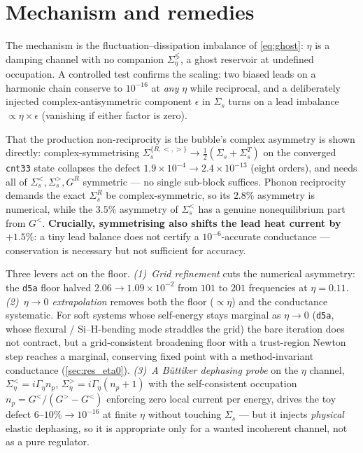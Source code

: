 \section{Mechanism and remedies}
\label{sec:cons_remedies}

The mechanism is the fluctuation--dissipation imbalance of \cref{eq:ghost}:
$\eta$ is a damping channel with no companion $\Sigma_\eta^{\lessgtr}$, a ghost
reservoir at undefined occupation. A controlled test confirms the scaling: two
biased leads on a harmonic chain conserve to $10^{-16}$ at \emph{any} $\eta$
while reciprocal, and a deliberately injected complex-antisymmetric component
$\epsilon$ in $\Sigma_s$ turns on a lead imbalance $\propto\eta\times\epsilon$
(vanishing if either factor is zero).

That the production non-reciprocity is the bubble's complex asymmetry is shown
directly: complex-symmetrising
$\Sigma_s^{\{R,<,>\}}\to\tfrac12(\Sigma_s+\Sigma_s^T)$ on the converged
\texttt{cnt33} state collapses the defect
$1.9\times10^{-4}\to2.4\times10^{-13}$ (eight orders), and needs all of
$\Sigma_s^<,\Sigma_s^>,G^R$ symmetric --- no single sub-block suffices. Phonon
reciprocity demands the exact $\Sigma_s^R$ be complex-symmetric, so its
$2.8\%$ asymmetry is numerical, while the $3.5\%$ asymmetry of $\Sigma_s^<$ has
a genuine nonequilibrium part from $G^<$. \textbf{Crucially, symmetrising also
shifts the lead heat current by $+1.5\%$}: a tiny lead balance does not certify
a $10^{-6}$-accurate conductance --- conservation is necessary but not
sufficient for accuracy.

Three levers act on the floor. \emph{(1)~Grid refinement} cuts the numerical
asymmetry: the \texttt{d5a} floor halved $2.06\to1.09\times10^{-2}$ from $101$
to $201$ frequencies at $\eta=0.11$. \emph{(2)~$\eta\to0$ extrapolation}
removes both the floor ($\propto\eta$) and the conductance systematic. For soft
systems whose self-energy stays marginal as $\eta\to0$ (\texttt{d5a}, whose flexural
/ Si--H-bending mode straddles the grid) the bare iteration does not contract, but a
grid-consistent broadening floor with a trust-region Newton step reaches a marginal,
conserving fixed point with a method-invariant conductance (\cref{sec:res_eta0}).
\emph{(3)~A B\"uttiker dephasing probe} on the $\eta$
channel, $\Sigma_\eta^<=i\Gamma_\eta n_p$, $\Sigma_\eta^>=i\Gamma_\eta(n_p+1)$
with the self-consistent occupation $n_p=G^</(G^>-G^<)$ enforcing zero local
current per energy, drives the toy defect $6\text{--}10\%\to10^{-16}$ at finite
$\eta$ without touching $\Sigma_s$ --- but it injects \emph{physical} elastic
dephasing, so it is appropriate only for a wanted incoherent channel, not as a
pure regulator.


